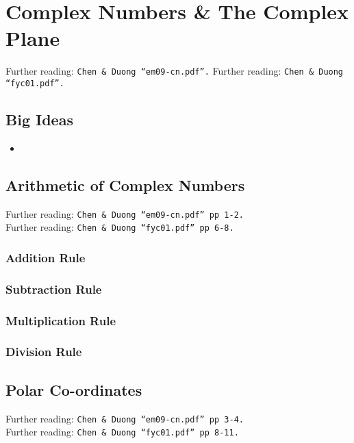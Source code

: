 \chapter{Complex Numbers \& The Complex Plane}
\label{chap:CN}
Further reading: \texttt{Chen \& Duong ``em09-cn.pdf''.}
Further reading: \texttt{Chen \& Duong ``fyc01.pdf''.}

\section{Big Ideas}
\label{sec:CN Big Ideas}
\begin{itemize}
  \item 
\end{itemize}

\section{Arithmetic of Complex Numbers}
\label{sec:CN Arithmetic of Complex Numbers}
Further reading: \texttt{Chen \& Duong ``em09-cn.pdf'' pp 1-2.} \\
Further reading: \texttt{Chen \& Duong ``fyc01.pdf'' pp 6-8.}

\subsection{Addition Rule}
\label{subsec:CN Arithmetic of Complex Numbers - Addition}

\subsection{Subtraction Rule}
\label{subsec:CN Arithmetic of Complex Numbers - Subtraction}

\subsection{Multiplication Rule}
\label{subsec:CN Arithmetic of Complex Numbers - Multiplication}

\subsection{Division Rule}
\label{subsec:CN Arithmetic of Complex Numbers - Division}

\section{Polar Co-ordinates}
\label{sec:CN Polar Co-ordinates}
Further reading: \texttt{Chen \& Duong ``em09-cn.pdf'' pp 3-4.} \\
Further reading: \texttt{Chen \& Duong ``fyc01.pdf'' pp 8-11.}